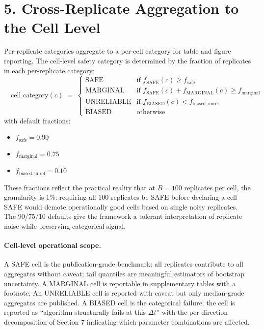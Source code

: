 \documentclass[11pt]{article}
\begin{document}
\section*{5. Cross-Replicate Aggregation to the Cell Level}
\label{sec:sc-aggregation}

Per-replicate categories aggregate to a per-cell category for table
and figure reporting. The cell-level safety category is determined by
the fraction of replicates in each per-replicate category:
\begin{equation}
\boxed{\quad
\mathrm{cell\_category}(c)
\;=\;
\begin{cases}
\mathrm{SAFE} & \text{if } f_{\mathrm{SAFE}}(c) \geq f_{\mathrm{safe}} \\
\mathrm{MARGINAL} & \text{if } f_{\mathrm{SAFE}}(c) + f_{\mathrm{MARGINAL}}(c) \geq f_{\mathrm{marginal}} \\
\mathrm{UNRELIABLE} & \text{if } f_{\mathrm{BIASED}}(c) < f_{\mathrm{biased,unrel}} \\
\mathrm{BIASED} & \text{otherwise}
\end{cases}
\quad}
\label{eq:sc-cell-aggregation}
\end{equation}
with default fractions:
\begin{itemize}
\item $f_{\mathrm{safe}} = 0.90$
\item $f_{\mathrm{marginal}} = 0.75$
\item $f_{\mathrm{biased,unrel}} = 0.10$
\end{itemize}

These fractions reflect the practical reality that at $B = 100$
replicates per cell, the granularity is 1\%: requiring all 100
replicates be SAFE before declaring a cell SAFE would demote
operationally good cells based on single noisy replicates. The 90/75/10
defaults give the framework a tolerant interpretation of replicate
noise while preserving categorical signal.

\paragraph{Cell-level operational scope.}
A SAFE cell is the publication-grade benchmark: all replicates
contribute to all aggregates without caveat; tail quantiles are
meaningful estimators of bootstrap uncertainty. A MARGINAL cell is
reportable in supplementary tables with a footnote. An UNRELIABLE
cell is reported with caveat but only median-grade aggregates are
published. A BIASED cell is the categorical failure: the cell is
reported as ``algorithm structurally fails at this $\Delta t$'' with
the per-direction decomposition of Section 7 indicating which
parameter combinations are affected.
\end{document}
